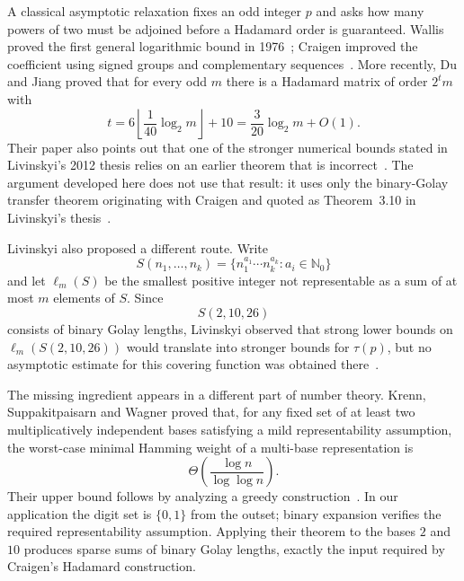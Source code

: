 \documentclass[11pt]{article}
\newcommand{\N}{\mathbb{N}}
\begin{document}
A classical asymptotic relaxation fixes an odd integer $p$ and asks how many powers of two must be adjoined before a Hadamard order is guaranteed.  Wallis proved the first general logarithmic bound in 1976~\cite{Wallis1976}; Craigen improved the coefficient using signed groups and complementary sequences~\cite{Craigen1995}.  More recently, Du and Jiang proved that for every odd $m$ there is a Hadamard matrix of order $2^t m$ with
\begin{equation}\label{eq:dujiang}
 t=6\left\lfloor \frac{1}{40}\log_2 m\right\rfloor+10
   =\frac{3}{20}\log_2 m+O(1).
\end{equation}
Their paper also points out that one of the stronger numerical bounds stated in Livinskyi's 2012 thesis relies on an earlier theorem that is incorrect~\cite{DuJiang2024}.  The argument developed here does not use that result: it uses only the binary-Golay transfer theorem originating with Craigen and quoted as Theorem~3.10 in Livinskyi's thesis~\cite{Craigen1995,Livinskyi2012}.

Livinskyi also proposed a different route.  Write
\[
S(n_1,\ldots,n_k)=\{n_1^{a_1}\cdots n_k^{a_k}:a_i\in\N_0\}
\]
and let $\ell_m(S)$ be the smallest positive integer not representable as a sum of at most $m$ elements of $S$.  Since
\[
S(2,10,26)
\]
consists of binary Golay lengths, Livinskyi observed that strong lower bounds on $\ell_m(S(2,10,26))$ would translate into stronger bounds for $\tau(p)$, but no asymptotic estimate for this covering function was obtained there~\cite{Livinskyi2012}.

The missing ingredient appears in a different part of number theory.  Krenn, Suppakitpaisarn and Wagner proved that, for any fixed set of at least two multiplicatively independent bases satisfying a mild representability assumption, the worst-case minimal Hamming weight of a multi-base representation is
\[
\Theta\!\left(\frac{\log n}{\log\log n}\right).
\]
Their upper bound follows by analyzing a greedy construction~\cite{Krenn2020}. In our application the digit set is $\{0,1\}$ from the outset; binary expansion verifies the required representability assumption.  Applying their theorem to the bases $2$ and $10$ produces sparse sums of binary Golay lengths, exactly the input required by Craigen's Hadamard construction.
\end{document}
